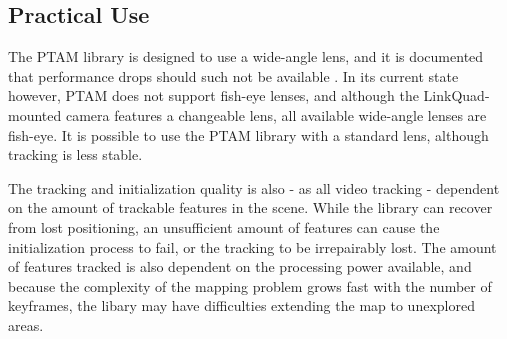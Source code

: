         \subsection{Practical Use}
            The PTAM library is designed to use a wide-angle lens, and it is
            documented that performance drops should such not be available \citep{klein07parallel}.
            In its current state however, PTAM does not support fish-eye lenses, and although
            the LinkQuad-mounted camera features a changeable lens, all
            available wide-angle lenses are fish-eye.
            It is possible to use the PTAM library with a standard lens, although
            tracking is less stable.

            The tracking and initialization quality is also - as all video tracking - dependent on the
            amount of trackable features in the scene.
            While the library can recover from lost positioning, an unsufficient amount
            of features can cause the initialization process to fail, or the tracking to
            be irrepairably lost.
            The amount of features tracked is also dependent on the processing
            power available, and because the complexity of the mapping
            problem grows fast with the number of keyframes, the libary may
            have difficulties extending the map to unexplored areas.
